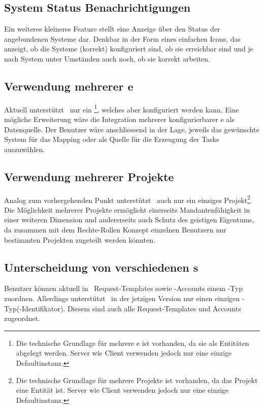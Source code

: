 			
		\subsection{System Status Benachrichtigungen}
			Ein weiteres kleineres Feature stellt eine Anzeige über den Status der angebundenen Systeme dar.
			Denkbar in der Form eines einfachen Icons, das anzeigt, 
			ob die Systeme (korrekt) konfiguriert sind, ob sie erreichbar sind
			und je nach System unter Umständen auch noch, ob sie korrekt arbeiten.		
		
		
	
		\subsection{Verwendung mehrerer \dks e}
			Aktuell unterstützt \eeppi\ nur ein \dks\footnote{Die technische Grundlage für mehrere \dks e ist vorhanden, da sie als Entitäten abgelegt werden. Server wie Client verwenden jedoch nur eine einzige Defaultinstanz.}, welches aber konfiguriert werden kann.
			Eine mögliche Erweiterung wäre die Integration mehrerer konfigurierbarer \dks e als Datenquelle.
			Der Benutzer wäre anschliessend in der Lage, jeweils das gewünschte System für das Mapping oder als Quelle für die Erzeugung der Tasks auszuwählen.
		
		
		\subsection{Verwendung mehrerer Projekte}
			Analog zum vorhergehenden Punkt unterstützt \eeppi\ auch nur ein einziges Projekt\footnote{Die technische Grundlage für mehrere Projekte ist vorhanden, da das Projekt eine Entität ist. Server wie Client verwenden jedoch nur eine einzige Defaultinstanz.}.
			Die Möglichkeit mehrerer Projekte ermöglicht einerseits Mandantenfähigkeit in einer weiteren Dimension und andererseits auch Schutz des geistigen Eigentums, 
			da zusammen mit dem Rechte-Rollen Konzept einzelnen Benutzern nur bestimmten Projekten zugeteilt werden könnten.


		\subsection{Unterscheidung von verschiedenen \ppt s}
			Benutzer können aktuell in \eeppi\ Request-Templates sowie \ppt-Accounts einem \ppt-Typ zuordnen.
			Allerdings unterstützt \eeppi\ in der jetzigen Version nur einen einzigen \ppt-Typ(-Identifikator).
			Diesem sind auch alle Request-Templates und Accounts zugeordnet.
			
